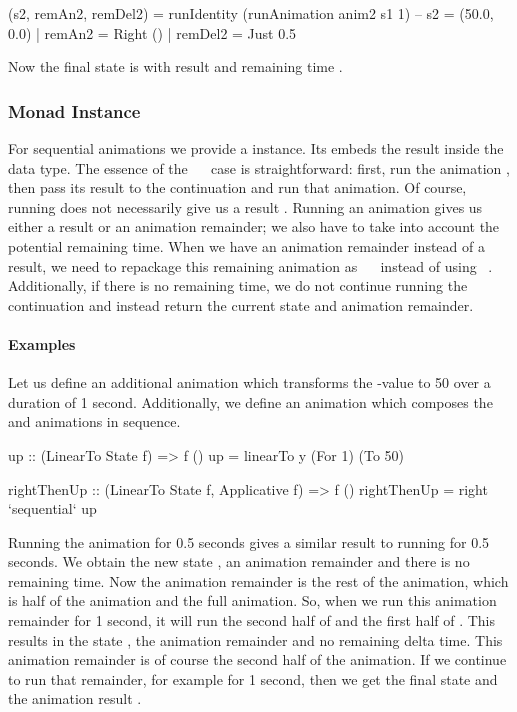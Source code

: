\begin{code}
(s2, remAn2, remDel2) = runIdentity (runAnimation anim2 s1 1)
-- s2 = (50.0, 0.0) | remAn2 = Right () | remDel2 = Just 0.5
\end{code}

Now the final state is  with result \hs{()} and remaining time .

\subsubsection{Monad Instance}

For sequential animations we provide a  instance. Its  embeds the
result  inside the  data type. The essence of the
~\hs{>>=}~ case is straightforward: first, run the animation
, then pass its result to the continuation  and run that animation.
Of course, running  does not necessarily give us a result . Running
an animation gives us either a result or an animation remainder; we also have
to take into account the potential remaining time. When we have an
animation remainder instead of a result, we need to repackage this remaining
animation as ~\hs{>>=}~ instead of using ~.
Additionally, if there is no remaining time,  we do not continue
running the continuation and instead return the current state and animation
remainder.

\paragraph{Examples}

Let us define an additional animation  which transforms the -value to 50 over a duration of 1 second. Additionally, we define an animation  which composes the  and  animations in sequence.

\begin{code}
up :: (LinearTo State f) => f ()
up = linearTo y (For 1) (To 50)

rightThenUp :: (LinearTo State f, Applicative f) => f ()
rightThenUp = right `sequential` up
\end{code}

Running the  animation for 0.5 seconds gives a similar result
to running  for 0.5 seconds. We obtain the new state , an animation remainder  and there is no remaining time.
Now the animation remainder is the rest of the  animation,
which is half of the  animation and the full  animation. So,
when we run this animation remainder for 1 second, it will run the second half
of  and the first half of .  This results in the state
, the animation remainder  and no remaining delta time.
This animation remainder is of course the second half of the  animation.
If we continue to run that remainder, for example for 1 second, then we get the
final state  and the animation result \hs{()}.

